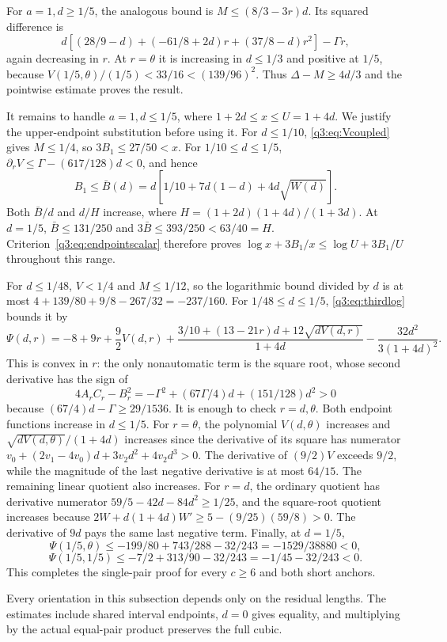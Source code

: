 For $a=1,d\ge1/5$, the analogous bound is $M\le(8/3-3r)d$. Its squared difference is
\[
 d[(28/9-d)+(-61/8+2d)r+(37/8-d)r^2]-\Gamma r,
\]
again decreasing in $r$. At $r=\theta$ it is increasing in $d\le1/3$ and positive at $1/5$, because $V(1/5,\theta)/(1/5)<33/16<(139/96)^2$. Thus $\Delta-M\ge4d/3$ and the pointwise estimate proves the result.

It remains to handle $a=1,d\le1/5$, where $1+2d\le x\le U=1+4d$. We justify the upper-endpoint substitution before using it. For $d\le1/10$, \eqref{q3:eq:Vcoupled} gives $M\le1/4$, so $3B_1\le27/50<x$. For $1/10\le d\le1/5$, $\partial_rV\le\Gamma-(617/128)d<0$, and hence
\[
 B_1\le\bar B(d)=d[1/10+7d(1-d)+4d\sqrt{W(d)}].
\]
Both $\bar B/d$ and $d/H$ increase, where
$H=(1+2d)(1+4d)/(1+3d)$.
At $d=1/5$, $\bar B\le131/250$ and $3\bar B\le393/250<63/40=H$. Criterion~\eqref{q3:eq:endpointscalar} therefore proves
$\log x+3B_1/x\le\log U+3B_1/U$ throughout this range.

For $d\le1/48$, $V<1/4$ and $M\le1/12$, so the logarithmic bound divided by $d$ is at most
$4+139/80+9/8-267/32=-237/160$.
For $1/48\le d\le1/5$, \eqref{q3:eq:thirdlog} bounds it by
\[
 \Psi(d,r)=-8+9r+\frac92V(d,r)
 +\frac{3/10+(13-21r)d+12\sqrt{dV(d,r)}}{1+4d}
 -\frac{32d^2}{3(1+4d)^2}.
\]
This is convex in $r$: the only nonautomatic term is the square root, whose second derivative has the sign of
\[
 4A_rC_r-B_r^2=-\Gamma^2+(67\Gamma/4)d+(151/128)d^2>0
\]
because $(67/4)d-\Gamma\ge29/1536$. It is enough to check $r=d,\theta$.
Both endpoint functions increase in $d\le1/5$. For $r=\theta$, the polynomial $V(d,\theta)$ increases and
$\sqrt{dV(d,\theta)}/(1+4d)$ increases since the derivative of its square has numerator
$v_0+(2v_1-4v_0)d+3v_2d^2+4v_2d^3>0$.
The derivative of $(9/2)V$ exceeds $9/2$, while the magnitude of the last negative derivative is at most $64/15$. The remaining linear quotient also increases.
For $r=d$, the ordinary quotient has derivative numerator
$59/5-42d-84d^2\ge1/25$, and the square-root quotient increases because
$2W+d(1+4d)W'\ge5-(9/25)(59/8)>0$.
The derivative of $9d$ pays the same last negative term.
Finally, at $d=1/5$,
\[
 \Psi(1/5,\theta)\le-199/80+743/288-32/243
 =-1529/38880<0,
\]
\[
 \Psi(1/5,1/5)\le-7/2+313/90-32/243=-1/45-32/243<0.
\]
This completes the single-pair proof for every $c\ge6$ and both short anchors.

Every orientation in this subsection depends only on the residual lengths. The estimates include shared interval endpoints, $d=0$ gives equality, and multiplying by the actual equal-pair product preserves the full cubic.

